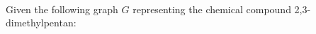 \documentclass[10pt]{article}
\begin{document}





\\
Given the following graph $G$ representing the chemical compound 2,3-dimethylpentan:
\end{document}
